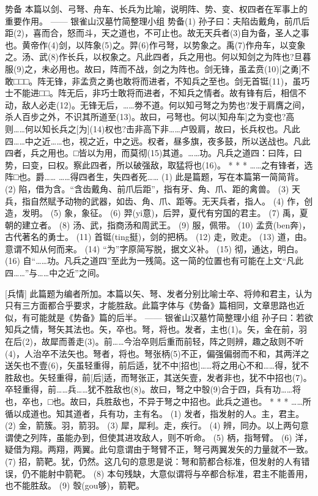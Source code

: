 \documentclass[12pt,UTF8]{ctexbook}
\begin{document}
势备
本篇以剑、弓弩、舟车、长兵为比喻，说明阵、势、变、权四者在军事上的重要作用。
—— 银雀山汉墓竹简整理小组
势备(1)
孙子曰：夫陷齿戴角，前爪后距(2)，喜而合，怒而斗，天之道也，不可止也。故无天兵者(3)自为备，圣人之事也。黄帝作(4)剑，以阵象(5)之。羿(6)作弓弩，以势象之。禹(7)作舟车，以变象之。汤、武(8)作长兵，以权象之。凡此四者，兵之用也。何以知剑之为阵也?旦暮服(9)之，未必用也。故曰，阵而不战，剑之为阵也。剑无锋，虽孟贲(10)[之勇]不敢□□□。阵无锋，非孟贲之勇也敢将而进者，不知兵之至也。剑无首铤(11)，虽巧士不能进□□。阵无后，非巧士敢将而进者，不知兵之情者。故有锋有后，相信不动，敌人必走(12)。无锋无后，……劵不道。何以知弓弩之为势也?发于肩膺之间，杀人百步之外，不识其所道至(13)。故曰，弓弩也。何以[知舟车]之为变也?高则……何以知长兵之[为](14)权也?击非高下非……卢毁肩，故曰，长兵权也。凡此四……中之近……也，视之近，中之远。权者，昼多旗，夜多鼓，所以送战也。凡此四者，兵之用也。□皆以为用，而莫彻(15)其道。……功。凡兵之道四：曰阵，曰势，曰变，曰权。察此四者，所以破强敌，取猛将也(16)。
* * *
……之有锋者，选阵□也。爵……
……得四者生，失四者死……
(1) 此是篇题，写在本篇第一简简背。
(2) 陷，借为含。“含齿戴角、前爪后距”，指有牙、角、爪、距的禽兽。
(3) 天兵，指自然赋予动物的武器，如齿、角、爪、距等。无天兵者，指人。
(4) 作，创造，发明。
(5) 象，象征。
(6) 羿(yi意)，后羿，夏代有穷国的君主。
(7) 禹，夏朝的建立者。
(8) 汤、武，指商汤和周武王。
(9) 服，佩带。
(10) 孟贲(ben奔)，古代著名的勇士。
(11) 首铤(ting挺)，剑的把柄。
(12) 走，败走。
(13) 道，由。意谓不知从何而来。
(14) “为”字原简写脱，据文义补。
(15) 彻，通达，明白。
(16) 自“……功。凡兵之道四”至此为一残简。这一简的位置也有可能在上文“凡此四……”与……中之近”之间。

[兵情]
此篇题为编者所加。本篇以矢、弩、发者分别比喻士卒、将帅和君主，认为只有三方面都合乎要求，才能胜敌。此篇字体与《势备》篇相同，文章思路也近似，有可能就是《势备》篇的后半。
—— 银雀山汉墓竹简整理小组
孙子曰：若欲知兵之情，弩矢其法也。矢，卒也。弩，将也。发者，主也(1)。矢，金在前，羽在后(2)，故犀而善走(3)。前……今治卒则后重而前轻，阵之则辨，趣之敌则不听(4)，人治卒不法矢也。弩者，将也。弩张柄(5)不正，偏强偏弱而不和，其两洋之送矢也不壹(6)，矢虽轻重得，前后适，犹不中[招也]……将之用心不和……得，犹不胜敌也。矢轻重得，前[后]适，而弩张正，其送矢壹，发者非也，犹不中招也(7)。卒轻重得，前……兵……犹不胜敌也(8)。故曰，弩之中彀(9)合于四，兵有功……将也，卒也，□也。故曰，兵胜敌也，不异于弩之中招也。此兵之道也。
* * *
……所循以成道也。知其道者，兵有功，主有名。
(1) 发者，指发射的人。主，君主。
(2) 金，箭簇。羽，箭羽。
(3) 犀，犀利。走，疾行。
(4) 辨，同办。以上两句意谓使之列阵，虽能办到，但使其进攻敌人，则不听命。
(5) 柄，指弩臂。
(6) 洋，疑借为翔。两翔，两翼。此句意谓由于弩臂不正，弩弓两翼发矢的力量就不一致。
(7) 招，箭靶。犹，仍然。这几句的意思是说：弩和箭都合标准，但发射的人有错误，仍不能射中箭靶。
(8) 本句残缺，大意似谓将与卒都合标准，君主不能善用，也不能胜敌。
(9) 彀(gou够)，箭靶。
\end{document}
